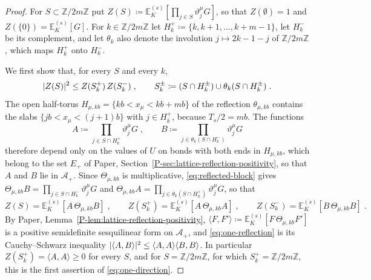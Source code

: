 \documentclass[11pt]{preprint}
\DeclarePairedDelimiter{\abs}{\lvert}{\rvert}
\numberwithin{equation}{section}
\theoremstyle{definition}
\theoremstyle{remark}
\theoremstyle{plain}
\begin{document}
\begin{proof}
For $S \subset \mathbb Z/2m\mathbb Z$ put $Z(S) \coloneqq \mathbb E^{(s)}_K[\prod_{j \in S}\vartheta^\mu_jG]$, so that $Z(\emptyset) = 1$ and $Z(\{ 0 \}) = \mathbb E^{(s)}_K[G]$. For $k \in \mathbb Z/2m\mathbb Z$ let $H^+_k \coloneqq \{ k, k + 1, \dots, k + m - 1 \}$, let $H^-_k$ be its complement, and let $\theta_k$ also denote the involution $j \mapsto 2k - 1 - j$ of $\mathbb Z/2m\mathbb Z$, which maps $H^+_k$ onto $H^-_k$.

We first show that, for every $S$ and every $k$,
\begin{equation}\label{eq:one-reflection}
    \abs{Z(S)}^2 \leq Z(S^+_k)\,Z(S^-_k)\;,
    \qquad
    S^\pm_k \coloneqq (S \cap H^\pm_k) \cup \theta_k(S \cap H^\pm_k)\;.
\end{equation}
The open half-torus $H_{\mu,kb} = \{ kb < x_\mu < kb + mb \}$ of the reflection $\theta_{\mu,kb}$ contains the slabs $\{ jb < x_\mu < (j + 1)b \}$ with $j \in H^+_k$, because $T_s/2 = mb$. The functions
\begin{equation}\label{eq:half-products}
    A \coloneqq \prod_{j \in S \cap H^+_k}\vartheta^\mu_jG\;,
    \qquad
    B \coloneqq \prod_{j \in \theta_k(S \cap H^-_k)}\vartheta^\mu_jG
\end{equation}
therefore depend only on the values of $U$ on bonds with both ends in $H_{\mu,kb}$, which belong to the set $E_+$ of Paper, Section~\ref{P-sec:lattice-reflection-positivity}, so that $A$ and $B$ lie in $\mathcal A_+$. Since $\Theta_{\mu,kb}$ is multiplicative, \eqref{eq:reflected-block} gives $\Theta_{\mu,kb}B = \prod_{j \in S \cap H^-_k}\vartheta^\mu_jG$ and $\Theta_{\mu,kb}A = \prod_{j \in \theta_k(S \cap H^+_k)}\vartheta^\mu_jG$, so that
\begin{equation}\label{eq:reflection-pairings}
    Z(S) = \mathbb E^{(s)}_K[A\,\Theta_{\mu,kb}B]\;,
    \qquad
    Z(S^+_k) = \mathbb E^{(s)}_K[A\,\Theta_{\mu,kb}A]\;,
    \qquad
    Z(S^-_k) = \mathbb E^{(s)}_K[B\,\Theta_{\mu,kb}B]\;.
\end{equation}
By Paper, Lemma~\ref{P-lem:lattice-reflection-positivity}, $\langle F, F'\rangle \coloneqq \mathbb E^{(s)}_K[F\,\Theta_{\mu,kb}F']$ is a positive semidefinite sesquilinear form on $\mathcal A_+$, and \eqref{eq:one-reflection} is its Cauchy--Schwarz inequality $\abs{\langle A, B\rangle}^2 \leq \langle A, A\rangle\langle B, B\rangle$. In particular $Z(S^+_k) = \langle A, A\rangle \geq 0$ for every $S$, and for $S = \mathbb Z/2m\mathbb Z$, for which $S^+_k = \mathbb Z/2m\mathbb Z$, this is the first assertion of \eqref{eq:one-direction}.


\end{proof}
\end{document}
